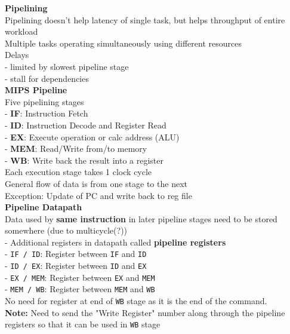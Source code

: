 \documentclass[10pt, a4paper]{article}
\newcommand{\highlight}[1]{{\color{red}\textbf{#1}}}
\begin{document}
\begin{multicols*}{3}
		{\normalsize\textbf{Pipelining}}\\
		Pipelining doesn't help latency of single task, but helps throughput of entire workload\\
		Multiple tasks operating simultaneously using different resources\\
		Delays\\
		- limited by slowest pipeline stage\\
		- stall for dependencies\\
		
		\textbf{MIPS Pipeline}\\
		Five pipelining stages\\
		- \highlight{IF}: Instruction Fetch\\
		- \highlight{ID}: Instruction Decode and Register Read\\
		- \highlight{EX}: Execute operation or calc address (ALU)\\
		- \highlight{MEM}: Read/Write from/to memory\\
		- \highlight{WB}: Write back the result into a register\\
		
		Each execution stage takes 1 clock cycle\\
		General flow of data is from one stage to the next\\
		
		Exception: Update of PC and write back to reg file\\
		
		\textbf{Pipeline Datapath}\\
		Data used by \highlight{same instruction} in later pipeline stages need to be stored somewhere (due to multicycle(?))\\
		- Additional registers in datapath called \highlight{pipeline registers}\\
		- \texttt{IF / ID}: Register between \texttt{IF} and \texttt{ID}\\
		- \texttt{ID / EX}: Register between \texttt{ID} and \texttt{EX}\\
		- \texttt{EX / MEM}: Register between \texttt{EX} and \texttt{MEM}\\
		- \texttt{MEM / WB}: Register between \texttt{MEM} and \texttt{WB}\\
		No need for register at end of \texttt{WB} stage as it is the end of the command.\\
		\highlight{Note:} Need to send the "Write Register" number along through the pipeline registers so that it can be used in \texttt{WB} stage\\
		

\end{multicols*}
\end{document}
